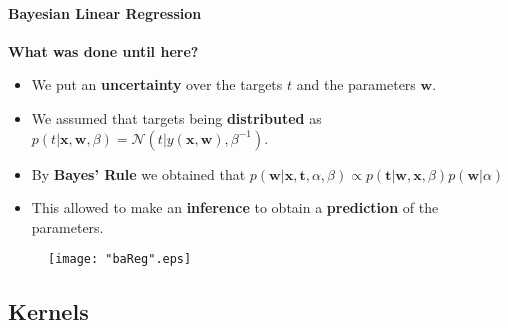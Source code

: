 \begin{frame}{\insertsubsection}
    \framesubtitle{Bayesian Linear Regression} 

    \textcolor{UniGold}{\textbf{What was done until here?}}
    \begin{itemize}
        \item We put an \textcolor{UniOrange}{\textbf{uncertainty}} over the targets $t$ and the parameters $\mathbf{w}$.
        \item We assumed that targets being \textcolor{UniOrange}{\textbf{distributed}} as $p( t| \mathbf{x}, \mathbf{w}, \beta) = \mathcal{N} ( t | y(\mathbf{x}, \mathbf{w}), \beta^{-1})$.
        \item By \textcolor{UniOrange}{\textbf{Bayes' Rule}} we obtained that $p\left( \mathbf{w} | \mathbf{x}, \mathbf{t}, \alpha, \beta \right) \propto p\left(  \mathbf{t} |\mathbf{w} ,\mathbf{x}, \beta \right) p\left( \mathbf{w} | \alpha \right)$
        \item This allowed to make an \textcolor{UniOrange}{\textbf{inference}} to obtain a \textcolor{UniOrange}{\textbf{prediction}} of the parameters.
        
    \end{itemize}

    \begin{figure}
		\label{fig:baReg}
        \hspace*{-1.4cm}\texttt{[image: "baReg".eps]}
	\end{figure}
\end{frame}

\subsection{Kernels}
\begin{frame}{\insertsubsection}
    
\end{frame}